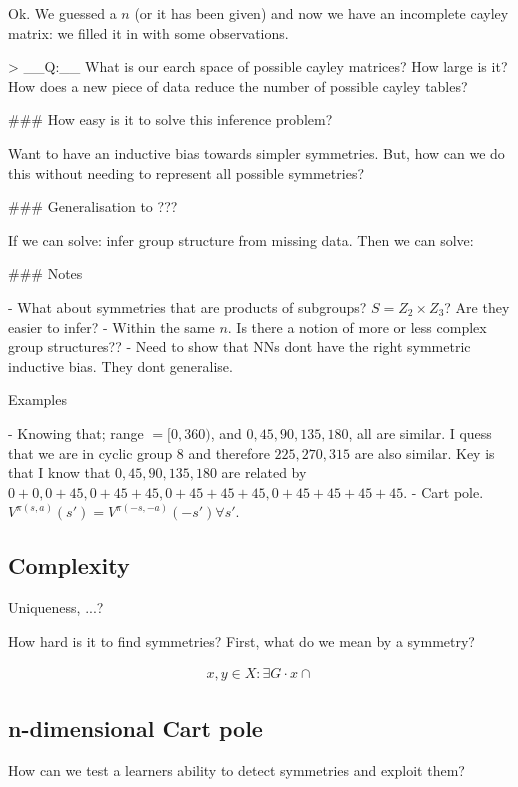 Ok. We guessed a $n$ (or it has been given) and now we have an incomplete cayley matrix: we filled it in with some observations.

> __Q:__ What is our earch space of possible cayley matrices? How large is it?
How does a new piece of data reduce the number of possible cayley tables?

### How easy is it to solve this inference problem?

Want to have an inductive bias towards simpler symmetries. But, how can we do this without needing to represent all possible symmetries?


### Generalisation to ???

If we can solve: infer group structure from missing data.
Then we can solve:

### Notes

- What about symmetries that are products of subgroups? $S = Z_2 \times Z_3$?
Are they easier to infer?
- Within the same $n$. Is there a notion of more or less complex group structures??
- Need to show that NNs dont have the right symmetric inductive bias. They dont generalise.

Examples

- Knowing that; range $= [0,360)$, and $0, 45, 90, 135, 180$, all are similar. I quess that we are in cyclic group $8$ and therefore $225, 270, 315$ are also similar. Key is that I know that $0, 45, 90, 135, 180$ are related by $0+0, 0+45, 0+45+45, 0+45+45+45, 0+45+45+45+45$.
- Cart pole. $V^{\pi(s, a)}(s') = V^{\pi(-s, -a)}(-s') \forall s'$.



\subsection{Complexity}

Uniqueness, ...?

How hard is it to find symmetries?
First, what do we mean by a symmetry?

\begin{align}
x, y \in X : \exists G \cdot x \cap
\end{align}



\subsection{n-dimensional Cart pole}

\begin{displayquote}
How can we test a learners ability to detect symmetries and exploit them?
\end{displayquote}

